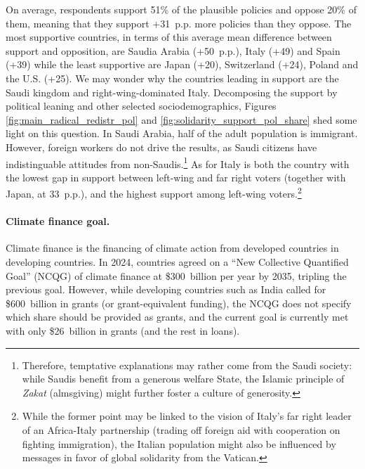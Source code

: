 \documentclass[12pt,english]{article}
\begin{document}
\begin{bibunit}
On average, respondents support 51\% of the plausible policies and oppose 20\% of them, meaning that they support +31~p.p. more policies than they oppose. The most supportive countries, in terms of this average mean difference between support and opposition, are Saudia Arabia (+50~p.p.), Italy (+49) and Spain (+39) while the least supportive are Japan (+20), Switzerland (+24), Poland and the U.S. (+25). 
We may wonder why the countries leading in support are the Saudi kingdom and right-wing-dominated Italy. Decomposing the support by political leaning and other selected sociodemographics, Figures \ref{fig:main_radical_redistr_pol} and \ref{fig:solidarity_support_pol_share} shed some light on this question. In Saudi Arabia, half of the adult population is immigrant. However, foreign workers do not drive the results, as Saudi citizens have indistinguable attitudes from non-Saudis.\footnote{Therefore, temptative explanations may rather come from the Saudi society: 
while Saudis benefit from a generous welfare State, the Islamic principle of \textit{Zakat} (almsgiving) might further foster a culture of generosity.} 
As for Italy is both the country with the lowest gap in support between left-wing and far right voters (together with Japan, at 33~p.p.), and the highest support among left-wing voters.\footnote{While the former point may be linked to the vision of Italy's far right leader of an Africa-Italy partnership (trading off foreign aid with cooperation on fighting immigration), the Italian population might also be influenced by messages in favor of global solidarity from the Vatican.} 

\paragraph{Climate finance goal.}

Climate finance is the financing of climate action from developed countries in developing countries. In 2024, countries agreed on a ``New Collective Quantified Goal'' (NCQG) of climate finance at \$300~billion per year by 2035, tripling the previous goal. However, while developing countries such as India called for \$600~billion in grants (or grant-equivalent funding), the NCQG does not specify which share should be provided as grants, and the current goal is currently met with only \$26~billion in grants \citep{oecd_climate_2024} (and the rest in loans). 


\end{bibunit}
\end{document}
